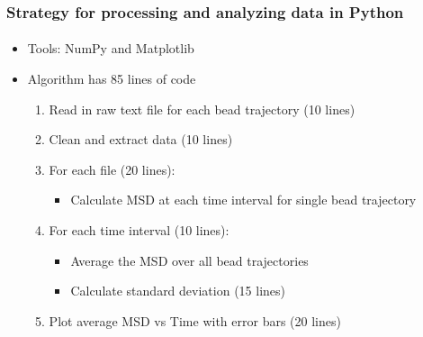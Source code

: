 \documentclass[mathserif]{beamer}
\begin{document}
  \begin{frame}
      \frametitle{Strategy for processing and analyzing data in Python}
      \framesubtitle{}
      \begin{itemize}
      \item Tools: NumPy and Matplotlib
      \item Algorithm has 85 lines of code
      \begin{enumerate}
      \item Read in raw text file for each bead trajectory (10 lines)
      \item Clean and extract data (10 lines)
      \item For each file (20 lines):
          \begin{itemize}
          \item Calculate MSD at each time interval for single bead trajectory
          \end{itemize}
      \item For each time interval (10 lines):
      	  \begin{itemize}
      	  \item Average the MSD over all bead trajectories
      	  \item Calculate standard deviation (15 lines)
      	  \end{itemize}
      \item Plot average MSD vs Time with error bars (20 lines)
      \end{enumerate}
      \end{itemize}
  \end{frame}
    
\end{document}
